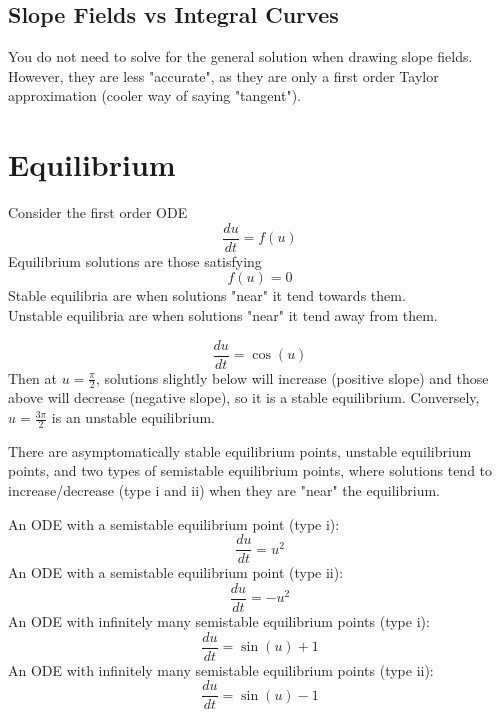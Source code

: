 \documentclass[12pt]{article}
\begin{document}
\subsection{Slope Fields vs Integral Curves}
You do not need to solve for the general solution when drawing slope fields. However, they are less "accurate", as they are only a first order Taylor approximation (cooler way of saying "tangent").

\section{Equilibrium}

\begin{defn}
Consider the first order ODE $$\frac{du}{dt} = f(u)$$
Equilibrium solutions are those satisfying $$f(u) = 0$$
Stable equilibria are when solutions "near" it tend towards them. \\
Unstable equilibria are when solutions "near" it tend away from them.
\end{defn}

\begin{ex}
$$\frac{du}{dt} = \cos(u)$$
Then at $u = \frac{\pi}{2}$, solutions slightly below will increase (positive slope) and those above will decrease (negative slope), so it is a stable equilibrium. Conversely, $u = \frac{3\pi}{2}$ is an unstable equilibrium.
\end{ex}

There are asymptomatically stable equilibrium points, unstable equilibrium points, and two types of semistable equilibrium points, where solutions tend to increase/decrease (type i and ii) when they are "near" the equilibrium.

\begin{ex}
An ODE with a semistable equilibrium point (type i): $$\frac{du}{dt} = u^2$$
An ODE with a semistable equilibrium point (type ii): $$\frac{du}{dt} = -u^2$$
An ODE with infinitely many semistable equilibrium points (type i): $$\frac{du}{dt} = \sin(u) + 1$$
An ODE with infinitely many semistable equilibrium points (type ii): $$\frac{du}{dt} = \sin(u) - 1$$
\end{ex}
\end{document}
